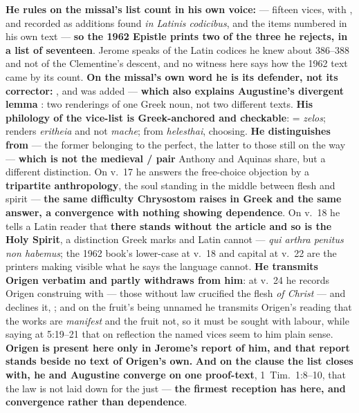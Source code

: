 \begin{witnessnote}
 \textbf{He rules on the missal's list count in his own voice:}
 --- fifteen
vices, with ,  and 
recorded as additions found \emph{in Latinis codicibus}, and the items numbered
in his own text --- \textbf{so the 1962 Epistle prints two of the three he
rejects, in a list of seventeen}. Jerome speaks of the Latin codices he knew
about 386--388 and not of the Clementine's descent, and no witness here says
how the 1962 text came by its count. \textbf{On the missal's
own word  he is its defender, not its corrector:}
, and  was added  --- \textbf{which
also explains Augustine's divergent lemma }: two renderings
of one Greek noun, not two different texts. \textbf{His philology of the
vice-list is Greek-anchored and checkable}:  = \emph{zelos};
 renders \emph{eritheia} and not \emph{mache}; 
from \emph{helesthai}, choosing. \textbf{He distinguishes  from
} --- the former belonging to the perfect, the latter to
those still on the way --- \textbf{which is not the medieval
/ pair} Anthony and Aquinas share, but a
different distinction. On v.~17 he answers the free-choice objection by a
\textbf{tripartite anthropology}, the soul standing in the middle between flesh
and spirit --- \textbf{the same difficulty Chrysostom raises in Greek and the
same answer, a convergence with nothing showing dependence}. On v.~18 he tells
a Latin reader that \textbf{ there stands without the article
and so is the Holy Spirit}, a distinction Greek marks and Latin cannot ---
\emph{qui arthra penitus non habemus}; the 1962 book's lower-case 
at v.~18 and capital  at v.~22 are the printers making visible
what he says the language cannot. \textbf{He transmits Origen verbatim and
partly withdraws from him}: at v.~24 he records Origen construing 
with  --- those without law crucified the flesh \emph{of Christ}
--- and declines it, ; and on the fruit's being unnamed he transmits Origen's reading that
the works are \emph{manifest} and the fruit not, so it must be sought with
labour, while saying at 5:19--21 that on reflection the named vices seem to him
plain sense. \textbf{Origen is present here only in Jerome's report of him, and that report
stands beside no text of Origen's own.} \textbf{And on the clause the list closes with,
he and Augustine converge on one proof-text}, 1~Tim.~1:8--10, that the law is
not laid down for the just --- \textbf{the firmest reception  has here, and convergence rather than dependence}.
\end{witnessnote}

